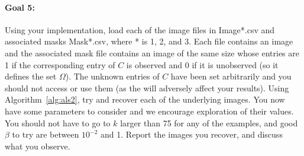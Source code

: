 \documentclass[11pt,onecolumn]{article}
\newcommand{\bluebox}[1]{
  \begin{tcolorbox}[colback=blue!5!white,colframe=blue!75!black,boxrule=0.5pt,boxsep=0pt,left=6pt,right=16pt,top=4pt,bottom=4pt]
  #1
  \end{tcolorbox}   
}
\begin{document}
\bluebox{
\paragraph{Goal 5:}
Using your implementation, load each of the image files in Image*.csv and associated masks Mask*.csv, where * is 1, 2, and 3. Each file contains an image and the associated mask file contains an image of the same size whose entries are 1 if the corresponding entry of $C$ is observed and 0 if it is unobserved (so it defines the set $\Omega$). The unknown entries of $C$ have been set arbitrarily and you should not access or use them (as the will adversely affect your results). Using Algorithm~\ref{alg:als2}, try and recover each of the underlying images. You now have some parameters to consider and we encourage exploration of their values. You should not have to go to $k$ larger than 75 for any of the examples, and good $\beta$ to try are between $10^{-2}$ and 1. Report the images you recover, and discuss what you observe.}



\end{document}
